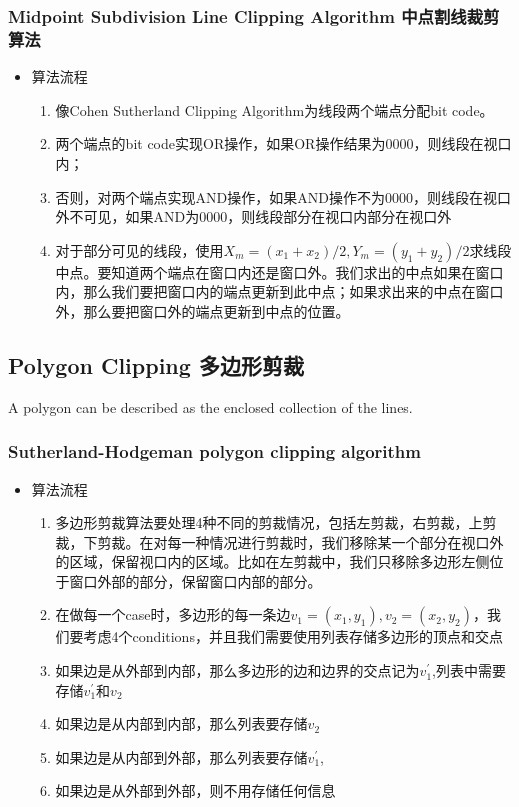 \documentclass[UTF8]{ctexart}
\begin{document}
\subsubsection{Midpoint Subdivision Line Clipping Algorithm 中点割线裁剪算法}
\begin{itemize}
    \item 算法流程
    \begin{enumerate}
        \item 像Cohen Sutherland Clipping Algorithm为线段两个端点分配bit code。
        \item 两个端点的bit code实现OR操作，如果OR操作结果为0000，则线段在视口内；
        \item 否则，对两个端点实现AND操作，如果AND操作不为0000，则线段在视口外不可见，如果AND为0000，则线段部分在视口内部分在视口外
        \item 对于部分可见的线段，使用$X_m=(x_1+x_2)/2, Y_m=(y_1+y_2)/2$求线段中点。要知道两个端点在窗口内还是窗口外。我们求出的中点如果在窗口内，那么我们要把窗口内的端点更新到此中点；如果求出来的中点在窗口外，那么要把窗口外的端点更新到中点的位置。
    \end{enumerate}
\end{itemize}

\subsection{Polygon Clipping 多边形剪裁}
A polygon can be described as the enclosed collection of the lines.

\subsubsection{Sutherland-Hodgeman polygon clipping algorithm}
\begin{itemize}
    \item 算法流程
    \begin{enumerate}
        \item 多边形剪裁算法要处理4种不同的剪裁情况，包括左剪裁，右剪裁，上剪裁，下剪裁。在对每一种情况进行剪裁时，我们移除某一个部分在视口外的区域，保留视口内的区域。比如在左剪裁中，我们只移除多边形左侧位于窗口外部的部分，保留窗口内部的部分。
        \item 在做每一个case时，多边形的每一条边$v_1=(x_1,y_1),v_2=(x_2,y_2)$，我们要考虑4个conditions，并且我们需要使用列表存储多边形的顶点和交点
        \item 如果边是从外部到内部，那么多边形的边和边界的交点记为$v^{'}_1$,列表中需要存储$v^{'}_1$和$v_2$
        \item 如果边是从内部到内部，那么列表要存储$v_2$
        \item 如果边是从内部到外部，那么列表要存储$v^{'}_1$,
        \item 如果边是从外部到外部，则不用存储任何信息
    \end{enumerate}
\end{itemize}
\end{document}
